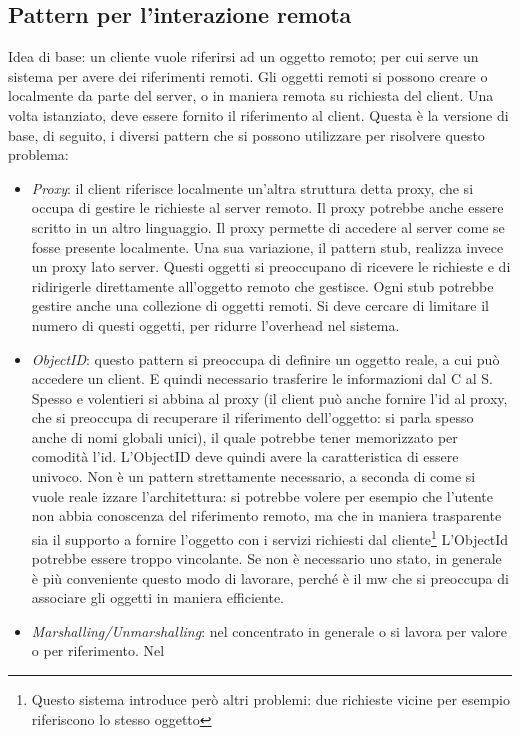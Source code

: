 \subsection{Pattern per l'interazione remota}
Idea di base: un cliente vuole riferirsi ad un oggetto remoto; per cui serve un sistema per avere dei riferimenti
remoti. Gli oggetti remoti si possono creare o localmente da parte del server, o in maniera remota su richiesta del
client. Una volta istanziato, deve essere fornito il riferimento al client. Questa è la versione di base, di seguito,
i diversi pattern che si possono utilizzare per risolvere questo problema:
\begin{itemize}
 \item \textit{Proxy}: il client riferisce localmente un'altra struttura detta proxy, che si occupa di gestire le
 richieste al server remoto. Il proxy potrebbe anche essere scritto in un altro linguaggio. Il proxy permette di
 accedere al server come se fosse presente localmente.
 Una sua variazione, il pattern stub, realizza invece un proxy lato server.
 Questi oggetti si preoccupano di ricevere le richieste e di ridirigerle direttamente all'oggetto remoto che gestisce.
 Ogni stub potrebbe gestire anche una collezione di oggetti remoti.
 Si deve cercare di limitare il numero di questi oggetti, per ridurre l'overhead nel sistema.
 \item \textit{ObjectID}: questo pattern si preoccupa di definire un oggetto reale, a cui può accedere un client. E
 quindi necessario trasferire le informazioni dal C al S. Spesso e volentieri si abbina al proxy (il client può anche
 fornire l'id al proxy, che si preoccupa di recuperare il riferimento dell'oggetto: si parla spesso anche di nomi
 globali unici), il quale potrebbe tener memorizzato per comodità l'id. L'ObjectID deve quindi avere la caratteristica
 di essere univoco.
 Non è un pattern strettamente necessario, a seconda di come si vuole reale izzare l'architettura: si potrebbe volere
 per esempio che l'utente non abbia conoscenza del riferimento remoto, ma che in maniera trasparente sia il
 supporto a fornire l'oggetto con i servizi richiesti dal cliente\footnote{Questo sistema introduce però altri
 problemi: due richieste vicine per esempio riferiscono lo stesso oggetto} L'ObjectId potrebbe essere troppo
 vincolante. Se non è necessario uno stato, in generale è più conveniente questo modo di lavorare, perché è il mw
 che si preoccupa di associare gli oggetti in maniera efficiente.
 \item \textit{Marshalling/Unmarshalling}: nel concentrato in generale o si lavora per valore o per riferimento. Nel

\end{itemize}
